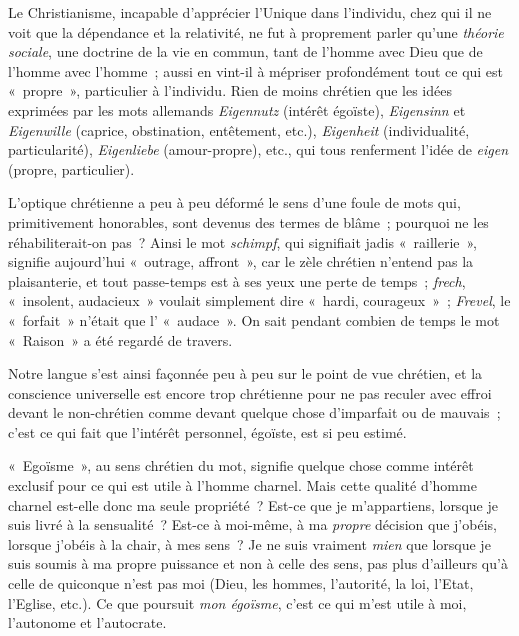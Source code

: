 \documentclass[french,twoside]{book} %
\begin{document}
Le Christianisme, incapable d’apprécier l’Unique dans l’individu, chez qui il ne voit que la dépendance et la relativité, ne fut à proprement parler qu’une \emph{théorie sociale}, une doctrine de la vie en commun, tant de l’homme avec Dieu que de l’homme avec l’homme ; aussi en vint-il à mépriser profondément tout ce qui est « propre », particulier à l’individu.  Rien de moins chrétien que les idées exprimées par les mots allemands \emph{Eigennutz} (intérêt égoïste), \emph{Eigensinn} et \emph{Eigenwille} (caprice, obstination, entêtement, etc.), \emph{Eigenheit} (individualité, particularité), \emph{Eigenliebe} (amour-propre), etc., qui tous renferment l’idée de \emph{eigen} (propre, particulier).\par
L’optique chrétienne a peu à peu déformé le sens d’une foule de mots qui, primitivement honorables, sont devenus des termes de blâme ; pourquoi ne les réhabiliterait-on pas ? Ainsi le mot \emph{schimpf}, qui signifiait jadis « raillerie », signifie aujourd’hui « outrage, affront », car le zèle chrétien n’entend pas la plaisanterie, et tout passe-temps est à ses yeux une perte de temps ; \emph{frech}, « insolent, audacieux » voulait simplement dire « hardi, courageux » ; \emph{Frevel}, le « forfait » n’était que l’ « audace ». On sait pendant combien de temps le mot « Raison » a été regardé de travers.\par
Notre langue s’est ainsi façonnée peu à peu sur le point de vue chrétien, et la conscience universelle est encore trop chrétienne pour ne pas reculer avec effroi devant le non-chrétien comme devant quelque chose d’imparfait ou de mauvais ; c’est ce qui fait que l’intérêt personnel, égoïste, est si peu estimé.\par
« Egoïsme », au sens chrétien du mot, signifie quelque chose comme intérêt exclusif pour ce qui est utile à l’homme charnel. Mais cette qualité d’homme charnel est-elle donc ma seule propriété ? Est-ce que je m’appartiens, lorsque je suis livré à la sensualité ? Est-ce à moi-même, à ma \emph{propre} décision que j’obéis, lorsque j’obéis à la chair, à mes sens ? Je ne suis vraiment \emph{mien} que lorsque je suis soumis à ma propre puissance et non à celle des sens, pas plus d’ailleurs qu’à celle de quiconque n’est pas moi (Dieu, les hommes, l’autorité, la loi, l’Etat, l’Eglise, etc.). Ce que poursuit \emph{mon égoïsme}, c’est ce qui m’est utile à moi, l’autonome et l’autocrate.\par
\end{document}
